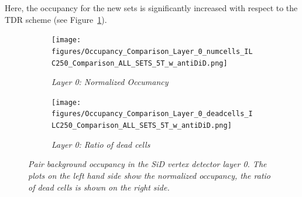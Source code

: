 Here, the occupancy for the new sets is significantly increased with respect to the TDR scheme (see Figure~\ref{fig:Layer0_Occupancy}). 
\begin{figure}[!h]
\centering
\begin{subfigure}[t]{0.45\textwidth}
\centering
\texttt{[image: figures/Occupancy\_Comparison\_Layer\_0\_numcells\_ILC250\_Comparison\_ALL\_SETS\_5T\_w\_antiDiD.png]}
\caption{\textit{Layer 0: Normalized Occumancy}}
\end{subfigure}
\hspace*{0.3cm}
\begin{subfigure}[t]{0.45\textwidth}
\centering
\texttt{[image: figures/Occupancy\_Comparison\_Layer\_0\_deadcells\_ILC250\_Comparison\_ALL\_SETS\_5T\_w\_antiDiD.png]}
\caption{\textit{Layer 0: Ratio of dead cells}}
\end{subfigure}
\caption{\textit{Pair background occupancy in the SiD vertex detector layer 0.
The plots on the left hand side show the normalized occupancy, the ratio of dead cells is shown on the right side.}}
\label{fig:Layer0_Occupancy}
\end{figure}

